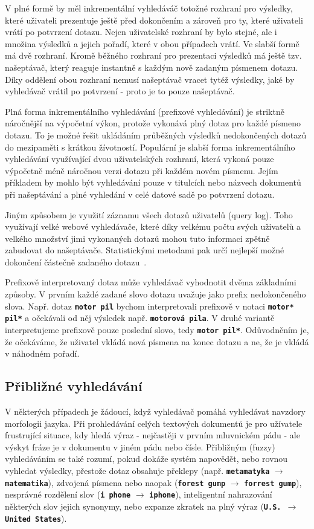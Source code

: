 \documentclass[11pt,letterpaper,oneside,openright]{book}
\newcommand{\bftt}[1]{\texttt{\textbf{#1}}}
\begin{document}
V plné formě by měl inkrementální vyhledáváč totožné rozhraní pro výsledky,
které uživateli prezentuje ještě před dokončením a zároveň pro ty, které
uživateli vrátí po potvrzení dotazu. Nejen uživatelské rozhraní by bylo stejné,
ale i množina výsledků a jejich pořadí, které v obou případech vrátí. Ve slabší
formě má dvě rozhraní. Kromě běžného rozhraní pro prezentaci výsledků má ještě
tzv. našeptávač, který reaguje instantně s každým nově zadaným písmenem dotazu.
Díky oddělení obou rozhraní nemusí našeptávač vracet tytéž výsledky, jaké by
vyhledávač vrátil po potvrzení - proto je to pouze našeptávač.

Plná forma inkrementálního vyhledávání (prefixové vyhledávání) je striktně
náročnější na výpočetní výkon, protože vykonává plný dotaz pro každé písmeno
dotazu. To je možné řešit ukládáním průběžných výsledků nedokončených dotazů do
mezipaměti s krátkou žívotností.  Populární je slabší forma inkrementálního
vyhledávání využívající dvou uživatelských rozhraní, která vykoná pouze
výpočetně méně náročnou verzi dotazu při každém novém písmenu.  Jejím příkladem
by mohlo být vyhledávání pouze v titulcích nebo názvech dokumentů při
našeptávání a plné vyhledání v celé datové sadě po potvrzení dotazu.

Jiným způsobem je využití záznamu všech dotazů uživatelů (query log). Toho
využívají velké webové vyhledávače, které díky velkému počtu svých uživatelů a
velkého množství jimi vykonaných dotazů mohou tuto informaci zpětně zabudovat
do našeptávače. Statistickými metodami pak určí nejlepší možné dokončení
částečně zadaného dotazu~\cite{Bar-Yossef:2008:MSE:1453856.1453868}.

Prefixově interpretovaný dotaz může vyhledávač vyhodnotit dvěma základními
způsoby. V prvním každé zadané slovo dotazu uvažuje jako prefix nedokončeného
slova. Např. dotaz \bftt{motor pil} bychom interpretovali prefixově v notaci
\bftt{motor* pil*} a očekávali od něj výsledek např. \bftt{motorová pila}. V
druhé variantě interpretujeme prefixově pouze poslední slovo, tedy \bftt{motor
pil*}. Odůvodněním je, že očekáváme, že uživatel vkládá nová písmena na konec
dotazu a ne, že je vkládá v náhodném pořadí.

\subsection{Přibližné vyhledávání}
V některých případech je žádoucí, když vyhledávač pomáhá vyhledávat navzdory
morfologii jazyka. Při prohledávání celých textových dokumentů je pro užívatele
frustrující situace, kdy hledá výraz - nejčastěji v prvním mluvnickém pádu -
ale výskyt fráze je v dokumentu v jiném pádu nebo čísle. Přibližným (fuzzy)
vyhledáváním se také rozumí, pokud dokáže systém napovědět, nebo rovnou
vyhledat výsledky, přestože dotaz obsahuje překlepy (např. \bftt{metamatyka}
$\rightarrow$ \bftt{matematika}), zdvojená písmena nebo naopak (\bftt{forest
gump}  $\rightarrow$ \bftt{forrest gump}), nesprávné rozdělení slov (\bftt{i
phone}  $\rightarrow$ \bftt{iphone}), inteligentní nahrazování některých slov
jejich synonymy, nebo expanze zkratek na plný výraz (\bftt{U.S.  $\rightarrow$
United States}).
\end{document}
